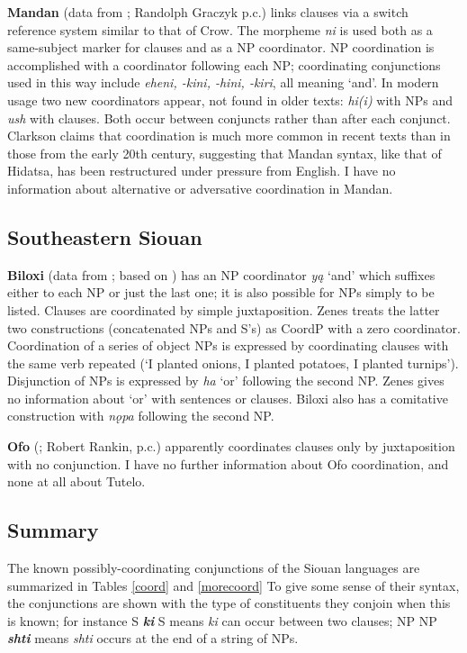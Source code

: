 \documentclass[output=paper]{LSP/langsci}
\begin{document}
\textbf{Mandan} (data from \citealt{Clarkson2012}; Randolph Graczyk p.c.) links clauses via a switch reference system similar to that of Crow. The morpheme \textit{ni} is used both as a same-subject marker for clauses and as a NP coordinator. NP coordination is accomplished with a coordinator following each NP; coordinating conjunctions used in this way include \textit{eheni, -kini, -hini, -kiri}, all meaning `and'. In modern usage two new coordinators appear, not found in older texts: \textit{hi(i)} with NPs and \textit{ush} with clauses. Both occur between conjuncts rather than after each conjunct. Clarkson claims that coordination is much more common in recent texts than in those from the early 20th century, suggesting that Mandan syntax, like that of Hidatsa, has been restructured under pressure from English. I have no information about alternative or adversative coordination in Mandan.  

\subsection{Southeastern Siouan}
 
\textbf{Biloxi} (data from \citealt{Zenes2009}; based on \citealt{DorseySwanton1912}) has an NP coordinator \textit{y\k{a}} `and' which suffixes either to each NP or just the last one; it is also possible for NPs simply to be listed. Clauses are coordinated by simple juxtaposition. Zenes treats the latter two constructions (concatenated NPs and S's) as CoordP with a zero coordinator. Coordination of a series of object NPs is expressed by coordinating clauses with the same verb repeated (`I planted onions, I planted potatoes, I planted turnips'). Disjunction of NPs is expressed by \textit{ha} `or' following the second NP. Zenes gives no information about `or' with sentences or clauses. Biloxi also has a comitative construction with \textit{n\k{o}pa} following the second NP.

\textbf{Ofo} (\citealt{DorseySwanton1912}; Robert Rankin, p.c.) apparently coordinates clauses only by juxtaposition with no conjunction. I have no further information about Ofo coordination, and none at all about Tutelo.

\subsection{Summary}

The known possibly-coordinating conjunctions of the Siouan languages are summarized in Tables \ref{coord} and \ref{morecoord} To give some sense of their syntax, the conjunctions are shown with the type of constituents they conjoin when this is known; for instance S \textit{\textbf{ki}} S means \textit{ki} can occur between two clauses; NP NP \textit{\textbf {shti}} means \textit {shti} occurs at the end of a string of NPs.
\end{document}
